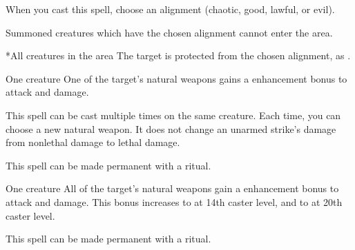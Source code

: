 \begin{spellheader}
    \spelldur{\durshort \dismissable}
    \spellspecial When you cast this spell, choose an alignment (chaotic, good, lawful, or evil).
\end{spellheader}
\begin{spelleffects}
    \spelleffect Summoned creatures which have the chosen alignment cannot enter the area.
    \begin{spelltargets}*{All creatures in the area}
        \spelleffect The target is protected from the chosen alignment, as .
    \end{spelltargets}
\end{spelleffects}
\begin{spellfooter}
    
\end{spellfooter}

\begin{spellheader}
    \spellrng{\rngclose}
    \spelldur{\durshort}
\end{spellheader}
\begin{spelleffects}
    \begin{spelltarget}{One creature}
        \spelleffect One of the target's natural weapons gains a  enhancement bonus to attack and damage. \spellbonusscalingdescription
    \end{spelltarget}
\end{spelleffects}
\begin{spellfooter}
    \spellnotes This spell can be cast multiple times on the same creature. Each time, you can choose a new natural weapon. It does not change an unarmed strike's damage from nonlethal damage to lethal damage.

    This spell can be made permanent with a  ritual.
\end{spellfooter}

\begin{spellheader}
    \spellrng{\rngclose}
    \spelldur{\durshort}
\end{spellheader}
\begin{spelleffects}
    \begin{spelltarget}{One creature}
        \spelleffect All of the target's natural weapons gain a  enhancement bonus to attack and damage. This bonus increases to  at 14th caster level, and to  at 20th caster level.
    \end{spelltarget}
\end{spelleffects}
\begin{spellfooter}
    \spellnotes This spell can be made permanent with a  ritual.
\end{spellfooter}

